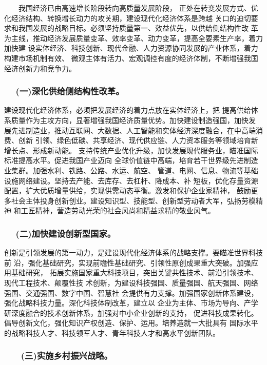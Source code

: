 \documentclass[11pt]{ctexart}
\begin{document}
{{{{　　我国经济已由高速增长阶段转向高质量发展阶段，
正处在转变发展方式、优化经济结构、转换增长动力的攻关期，建设现代化经济体系是跨越
关口的迫切要求和我国发展的战略目标。必须坚持质量第一、效益优先，以供给侧结构性改
革为主线，推动经济发展质量变革、效率变革、动力变革，提高全要素生产率，着力加快建
设实体经济、科技创新、现代金融、人力资源协同发展的产业体系，着力构建市场机制有效、
微观主体有活力、宏观调控有度的经济体制，不断增强我国经济创新力和竞争力。

\subsubsection{　 (一)深化供给侧结构性改革。}
\label{sec:org8618c08}

建设现代化经济体系，必须把发展经济的着力点放在实体经济上，把
提高供给体系质量作为主攻方向，显著增强我国经济质量优势。加快建设制造强国，加快发
展先进制造业，推动互联网、大数据、人工智能和实体经济深度融合，在中高端消费、创新
引领、绿色低碳、共享经济、现代供应链、人力资本服务等领域培育新增长点、形成新动能。
支持传统产业优化升级，加快发展现代服务业，瞄准国际标准提高水平。促进我国产业迈向
全球价值链中高端，培育若干世界级先进制造业集群。加强水利、铁路、公路、水运、航空、
管道、电网、信息、物流等基础设施网络建设。坚持去产能、去库存、去杠杆、降成本、补
短板，优化存量资源配置，扩大优质增量供给，实现供需动态平衡。激发和保护企业家精神，
鼓励更多社会主体投身创新创业。建设知识型、技能型、创新型劳动者大军，弘扬劳模精神
和工匠精神，营造劳动光荣的社会风尚和精益求精的敬业风气。

\subsubsection{　 (二)加快建设创新型国家。}
\label{sec:orgf8f679c}

创新是引领发展的第一动力，是建设现代化经济体系的战略支撑。要瞄准世界科技前
沿，强化基础研究，实现前瞻性基础研究、引领性原创成果重大突破。加强应用基础研究，
拓展实施国家重大科技项目，突出关键共性技术、前沿引领技术、现代工程技术、颠覆性技
术创新，为建设科技强国、质量强国、航天强国、网络强国、交通强国、数字中国、智慧社
会提供有力支撑。加强国家创新体系建设，强化战略科技力量。深化科技体制改革，建立以
企业为主体、市场为导向、产学研深度融合的技术创新体系，加强对中小企业创新的支持，
促进科技成果转化。倡导创新文化，强化知识产权创造、保护、运用。培养造就一大批具有
国际水平的战略科技人才、科技领军人才、青年科技人才和高水平创新团队。

\subsubsection{　　(三)实施乡村振兴战略。}
\label{sec:org4bd0200}

}}}}
\end{document}
